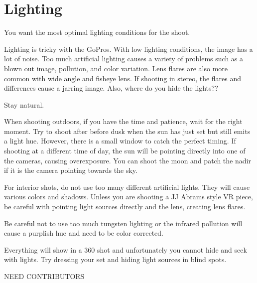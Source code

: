 \chapter{Lighting}
\pagecolor{white}
\label{chap:25}
\begin{fullwidth}


\problem

{\large You want the most optimal lighting conditions for the shoot. \par}

Lighting is tricky with the GoPros. With low lighting conditions, the image has a lot of noise. Too much artificial lighting causes a variety of problems such as a blown out image, pollution, and color variation. Lens flares are also more common with wide angle and fisheye lens. If shooting in stereo, the flares and differences cause a jarring image. Also, where do you hide the lights??

\solution

{\large Stay natural. 
 \par}

When shooting outdoors, if you have the time and patience, wait for the right moment. Try to shoot after before dusk when the sun has just set but still emits a light hue. However, there is a small window to catch the perfect timing. If shooting at a different time of day, the sun will be pointing directly into one of the cameras, causing overexposure. You can shoot the moon and patch the nadir if it is the camera pointing towards the sky. 

For interior shots, do not use too many different artificial lights. They will cause various colors and shadows. Unless you are shooting a JJ Abrams style VR piece, be careful with pointing light sources directly and the lens, creating lens flares.

Be careful not to use too much tungsten lighting or the infrared pollution will cause a purplish hue and need to be color corrected. 

Everything will show in a 360 shot and unfortunately you cannot hide and seek with lights. Try dressing your set and hiding light sources in blind spots. 

NEED CONTRIBUTORS

\clearpage
\end{fullwidth}